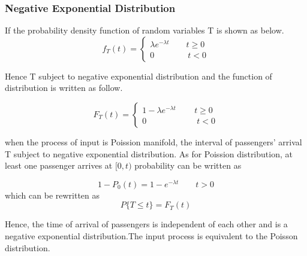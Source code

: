 \documentclass{mcmthesis}
\begin{document}
\subsubsection{Negative Exponential Distribution}
If the probability density function of random variables T is shown as below.
\begin{equation}    
f_T(t)=\left  \{
       \begin{array}{lr}
           \lambda e^{-\lambda t}\qquad t\geqslant 0\\
            0\qquad\qquad t<0
        \end{array}
\right.
\end{equation}


Hence T subject to negative exponential distribution and the function of distribution is written as follow.

\begin{equation}    
F_T(t)=\left  \{
       \begin{array}{lr}
          1- \lambda e^{-\lambda t}\qquad\,  t\geqslant 0\\
            0\qquad\qquad\qquad t<0
        \end{array}
\right.
\end{equation}

when the  process of input is Poission manifold, the interval of passengers' arrival T subject to  negative exponential distribution. As for Poission  distribution, at least one passenger arrives at $[0,t)$  probability can  be written as


\begin{equation}
1-P_0(t)=1-e^{-\lambda t}\qquad t>0
\end{equation}
which can be rewritten as
\begin{equation}
 P\{T\leqslant t \}=F_T(t)
\end{equation}


Hence, the time of arrival of passengers is independent of each other and is a negative exponential distribution.The input process is equivalent to the Poisson distribution.
\end{document}
